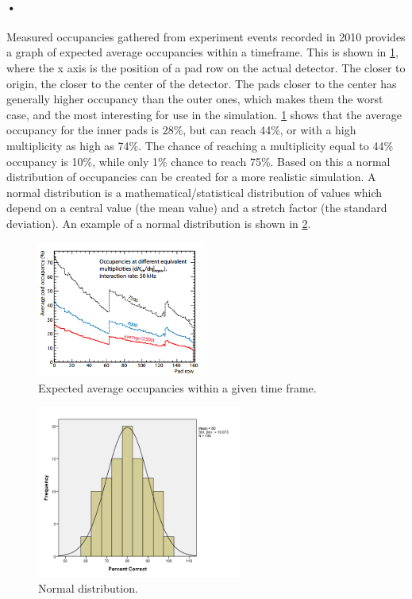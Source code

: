 \documentclass[a4paper, 12pt]{report}
\begin{document}
\paragraph{•}
Measured occupancies gathered from experiment events recorded in 2010 provides a graph of expected average occupancies within a timeframe.
This is shown in \ref{fig:expected-occupancy}, where the x axis is the position of a pad row on the actual detector.
The closer to origin, the closer to the center of the detector.
The pads closer to the center has generally higher occupancy than the outer ones, which makes them the worst case, and the most interesting for use in the simulation.
\ref{fig:expected-occupancy} shows that the average occupancy for the inner pads is 28\%, but can reach 44\%, or with a high multiplicity as high as 74\%.
The chance of reaching a multiplicity equal to 44\% occupancy is 10\%, while only 1\% chance to reach 75\%.
Based on this a normal distribution of occupancies can be created for a more realistic simulation.
A normal distribution is a mathematical/statistical distribution of values which depend on a central value (the mean value) and a stretch factor (the standard deviation)\cite{normal-dist}.
An example of a normal distribution is shown in \ref{fig:normal-dist}.

\begin{figure}[h!]
	\centering
		\includegraphics[width=0.5\textwidth]{images/expected-occupancy.png}
		\caption{Expected average occupancies within a given time frame. \cite{tdr-016}}
		\label{fig:expected-occupancy}
\end{figure}


\begin{figure}[h!]
	\centering
		\includegraphics[width=0.6\textwidth]{images/normal-dist.png}
		\caption{Normal distribution. \cite{normal-dist-image}}
		\label{fig:normal-dist}
\end{figure}
\end{document}
